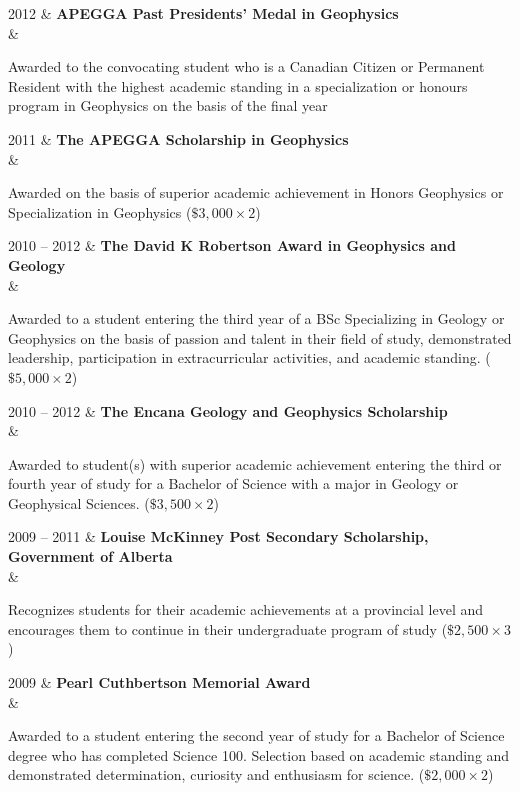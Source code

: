 \documentclass[oneside]{cv}
\newenvironment{myquote}%
  {\list{}{\leftmargin=0.5cm\rightmargin=0cm}\item[]}%
  {\endlist}
\newcommand{\myindent}[1]{
    \begin{myquote}
    \vspace{-0.7cm}
        #1
    \vspace{-0.4cm}
    \end{myquote}
}
\begin{document}
\begin{entryright}
2012 & \textbf{APEGGA Past Presidents’ Medal in Geophysics} \\
& \myindent{Awarded to the convocating student who is a Canadian Citizen or Permanent Resident with the highest academic standing in a specialization or honours program in Geophysics on the basis of the final year}
\end{entryright}

\begin{entryright}
2011 & \textbf{The APEGGA Scholarship in Geophysics} \\
& \myindent{Awarded on the basis of superior academic achievement in Honors Geophysics or Specialization in Geophysics ($\$3,000 \times 2$)}
\end{entryright}

\begin{entryright}
2010 -- 2012 & \textbf{The David K Robertson Award in Geophysics and Geology} \\
& \myindent{Awarded to a student entering the third year of a BSc Specializing in Geology or Geophysics on the basis of passion and talent in their field of study, demonstrated leadership, participation in extracurricular activities, and academic standing. ($\$5,000 \times 2$)}
\end{entryright}

\begin{entryright}
2010 -- 2012 & \textbf{The Encana Geology and Geophysics Scholarship} \\
& \myindent{Awarded to student(s) with superior academic achievement entering the third or fourth year of study for a Bachelor of Science with a major in Geology or Geophysical Sciences. ($\$3,500 \times 2$)}
\end{entryright}

\begin{entryright}
2009 -- 2011 & \textbf{Louise McKinney Post Secondary Scholarship, Government of Alberta} \\
& \myindent{Recognizes students for their academic achievements at a provincial level and encourages them to continue in their undergraduate program of study ($\$2,500 \times 3$)}
\end{entryright}

\begin{entryright}
2009 & \textbf{Pearl Cuthbertson Memorial Award} \\
& \myindent{Awarded to a student entering the second year of study for a Bachelor of Science degree who has completed Science 100. Selection based on academic standing and demonstrated determination, curiosity and enthusiasm for science. ($\$2,000 \times 2$)}
\end{entryright}
\end{document}
